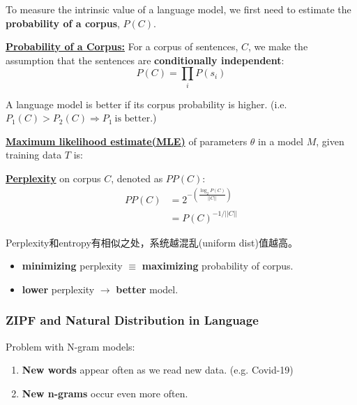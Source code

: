 \documentclass{ainote}
\begin{document}
To measure the intrinsic value of a language model, we first need to estimate the \textbf{probability of a corpus}, $P(C)$.
\begin{info}
    \textbf{\underline{Probability of a Corpus:}}
    \spskip
    For a corpus of sentences, $C$, we make the assumption that the sentences are \textbf{conditionally independent}:
    \begin{equation*}
        P(C)=\prod_i P(s_i)
    \end{equation*}    
\end{info}
\begin{note}
    A language model is better if its corpus probability is higher. (i.e. $P_1(C) > P_2(C) \Longrightarrow P_1\ \text{is better.}$)
\end{note}

\begin{info}
    \textbf{\underline{Maximum likelihood estimate(MLE)}} of parameters $\theta$ in a model $M$, given training data $T$ is:
\end{info}

\begin{info}
    \textbf{\underline{Perplexity}} on corpus $C$, denoted as $PP(C)$:
    \begin{align*}
        PP(C)&=2^{-\left(\frac{\log_2 P(C)}{||C||}\right)}\\
        &=P(C)^{-1/||C||}
    \end{align*}
\end{info}
Perplexity和entropy有相似之处，系统越混乱(uniform dist)值越高。
\begin{note}
    \begin{itemize}
        \item \textbf{minimizing} perplexity $\equiv$ \textbf{maximizing} probability of corpus.
        \item \textbf{lower} perplexity $\longrightarrow$ \textbf{better} model.
    \end{itemize}
\end{note}

\subsubsection{ZIPF and Natural Distribution in Language}
Problem with N-gram models:
\begin{enumerate}
    \item \textbf{New words} appear often as we read new data. (e.g. Covid-19)
    \item {}\textbf{New n-grams} occur even more often.
\end{enumerate}
\end{document}
